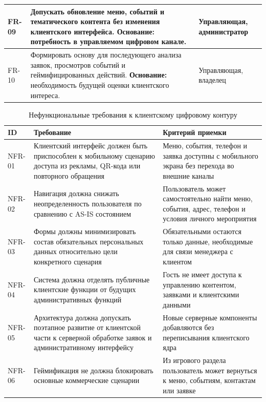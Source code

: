 \begin{table}[H]
\begin{tabularx}{\textwidth}{|>{\raggedright\arraybackslash}p{}|>{\raggedright\arraybackslash}p{}|>{\raggedright\arraybackslash}X|}
FR-09 & Допускать обновление меню, событий и тематического контента без изменения клиентского интерфейса. \newline \textbf{Основание:} потребность в управляемом цифровом канале. & Управляющая, администратор \\ \hline
FR-10 & Формировать основу для последующего анализа заявок, просмотров событий и геймифицированных действий. \newline \textbf{Основание:} необходимость будущей оценки клиентского интереса. & Управляющая, владелец \\ \hline
\end{tabularx}
\normalsize
\end{table}

\begin{table}[H]
\centering
\small
\caption{Нефункциональные требования к клиентскому цифровому контуру}
\label{tab:ch3_nonfunctional_requirements}
\begin{tabularx}{\textwidth}{|>{\raggedright\arraybackslash}p{}|>{\raggedright\arraybackslash}p{}|>{\raggedright\arraybackslash}X|}
\hline
\textbf{ID} & \textbf{Требование} & \textbf{Критерий приемки} \\ \hline
NFR-01 & Клиентский интерфейс должен быть приспособлен к мобильному сценарию доступа из рекламы, QR-кода или повторного обращения & Меню, события, телефон и заявка доступны с мобильного экрана без перехода во внешние каналы \\ \hline
NFR-02 & Навигация должна снижать неопределенность пользователя по сравнению с AS-IS состоянием & Пользователь может самостоятельно найти меню, события, адрес, телефон и условия личного мероприятия \\ \hline
NFR-03 & Формы должны минимизировать состав обязательных персональных данных относительно цели конкретного сценария & Обязательными остаются только данные, необходимые для связи менеджера с клиентом \\ \hline
NFR-04 & Система должна отделять публичные клиентские функции от будущих административных функций & Гость не имеет доступа к управлению контентом, заявками и клиентскими данными \\ \hline
NFR-05 & Архитектура должна допускать поэтапное развитие от клиентской части к серверной обработке заявок и административному интерфейсу & Новые серверные компоненты добавляются без переписывания клиентского ядра \\ \hline
NFR-06 & Геймификация не должна блокировать основные коммерческие сценарии & Из игрового раздела пользователь может вернуться к меню, событиям, контактам или заявке \\ \hline

\end{tabularx}
\end{table}

